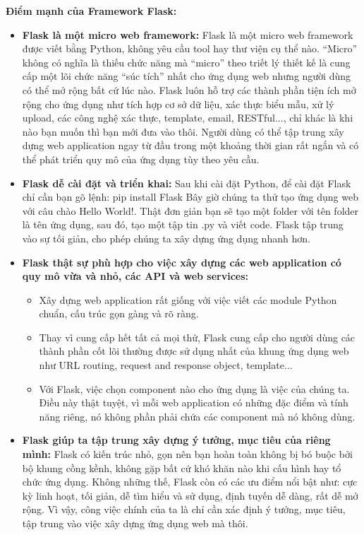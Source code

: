 \textbf{Điểm mạnh của Framework Flask:}
\begin{itemize}
  \item \textbf{Flask là một micro web framework:} Flask là một micro web framework được viết bằng Python, không yêu cầu tool hay thư viện cụ thể nào. “Micro” không có nghĩa là thiếu chức năng mà “micro” theo triết lý thiết kế là cung cấp một lõi chức năng “súc tích” nhất cho ứng dụng web nhưng người dùng có thể mở rộng bất cứ lúc nào. Flask luôn hỗ trợ các thành phần tiện ích mở rộng cho ứng dụng như tích hợp cơ sở dữ liệu, xác thực biểu mẫu, xử lý upload, các công nghệ xác thực, template, email, RESTful..., chỉ khác là khi nào bạn muốn thì bạn mới đưa vào thôi. Người dùng có thể tập trung xây dựng web application ngay từ đầu trong một khoảng thời gian rất ngắn và có thể phát triển quy mô của ứng dụng tùy theo yêu cầu.
  \item \textbf{Flask dễ cài đặt và triển khai:} Sau khi cài đặt Python, để cài đặt Flask chỉ cần bạn gõ lệnh: pip install Flask Bây giờ chúng ta thử tạo ứng dụng web với câu chào Hello World!. Thật đơn giản bạn sẽ tạo một folder với tên folder là tên ứng dụng, sau đó, tạo một tập tin .py và viết code. Flask tập trung vào sự tối giản, cho phép chúng ta xây dựng ứng dụng nhanh hơn.
  \item \textbf{Flask thật sự phù hợp cho việc xây dựng các web application có quy mô vừa và nhỏ, các API và web services:} 
  \begin{itemize}
    \item Xây dựng web application rất giống với việc viết các module Python chuẩn, cấu trúc gọn gàng và rõ ràng.
    \item Thay vì cung cấp hết tất cả mọi thứ, Flask cung cấp cho người dùng các thành phần cốt lõi thường được sử dụng nhất của khung ứng dụng web như URL routing, request and response object, template...
    \item Với Flask, việc chọn component nào cho ứng dụng là việc của chúng ta. Điều này thật tuyệt, vì mỗi web application có những đặc điểm và tính năng riêng, nó không phần phải chứa các component mà nó không dùng.
\end{itemize}
  \item \textbf{Flask giúp ta tập trung xây dựng ý tưởng, mục tiêu của riêng mình:} Flask có kiến trúc nhỏ, gọn nên bạn hoàn toàn không bị bó buộc bởi bộ khung cồng kềnh, không gặp bất cứ khó khăn nào khi cấu hình hay tổ chức ứng dụng. Không những thế, Flask còn có các ưu điểm nổi bật như: cực kỳ linh hoạt, tối giản, dễ tìm hiểu và sử dụng, định tuyến dễ dàng, rất dễ mở rộng. Vì vậy, công việc chính của ta là chỉ cần xác định ý tưởng, mục tiêu, tập trung vào việc xây dựng ứng dụng web mà thôi.

\end{itemize}
